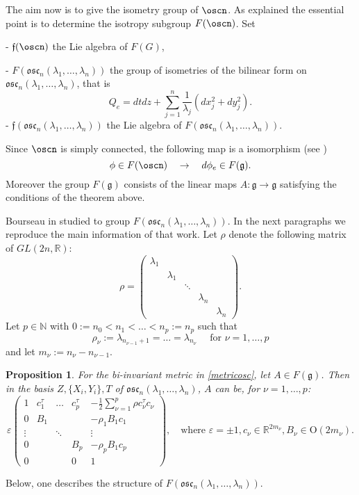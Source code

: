 \documentclass[11pt]{amsart}
\theoremstyle{plain}
\newtheorem{prop}[thm]{Proposition}
\theoremstyle{definition}
\theoremstyle{remark}
\begin{document}
The aim now is to give the isometry group of $\oscn$. As explained the essential point is to determine the isotropy subgroup $F(\oscn)$. Set 

- $\mathfrak f(\oscn)$ the Lie algebra of $F(G)$,

- $F(\mathfrak{osc}_n(\lambda_1, \hdots, \lambda_n))$ the group of isometries of the bilinear form on $\mathfrak{osc}_n(\lambda_1, \hdots, \lambda_n)$, that is 
$$Q_e = dtdz + \sum_{j=1}^n \frac{1}{\lambda_j}(dx_j^2 + dy_j^2).$$
- $\mathfrak f(\mathfrak{osc}_n(\lambda_1, \hdots, \lambda_n))$ the Lie algebra of $F(\mathfrak{osc}_n(\lambda_1, \hdots, \lambda_n))$. 

Since $\oscn$ is simply connected, the following map is a isomorphism (see \cite{MU})
$$\phi \in F(\oscn) \quad \to \quad d\phi_e\in F(\mathfrak g).$$
Moreover the group $F(\mathfrak g)$ consists of the linear maps $A:\mathfrak g\to \mathfrak g$ satisfying the conditions of the theorem above. 

Bourseau in\cite{Bou} studied to group $F(\mathfrak{osc}_n(\lambda_1, \hdots, \lambda_n))$. In the next paragraphs we reproduce the main  information of that work. Let $\rho$ denote the following matrix of $GL(2n, \mathbb R)$:
$$ \rho = \left( 
\begin{matrix} 
\lambda_1 & & & & \\
& \lambda_1 &   & &\\
& & \ddots & & \\
& & & \lambda_n & \\
& & & & \lambda_n
\end{matrix}\right).$$
Let $p\in \mathbb N$ with $0:=n_0 < n_1 < \hdots < n_p:=n_p$ such that
$$\rho_{\nu}:=\lambda_{n_{\nu - 1}+ 1}= \hdots = \lambda_{n_{\nu}}\quad \mbox{ for } \nu=1, \hdots, p$$ and let $m_{\nu}:=n_{\nu}- n_{{\nu}-1}$. 
    
    \begin{prop} For the bi-invariant metric in \eqref{metricosc}, let $A\in F(\mathfrak g)$. Then in the basis $Z, \{X_i, Y_i\}, T$ of $\mathfrak{osc}_n(\lambda_1, \hdots, \lambda_n)$, $A$ can be, for $\nu=1, \hdots, p$:
    	$$\varepsilon  \left( 
    	\begin{matrix} 
    	 1 &	c_1^{\tau}	&\hdots  &c_p^{\tau}   &   -\frac12 \sum_{\nu=1}^p  \rho c_{\nu}^{\tau} c_{\nu}\\
    0	 &	B_1 & & &  - \rho_1 B_1 c_1\\
    \vdots	&	& \ddots &   &  \vdots\\
    0	&	& & B_p &  - \rho_p B_1 c_p\\
   0 & & & 0 & 1
    	\end{matrix}\right), \quad \mbox{where } \varepsilon=\pm 1, c_{\nu}\in \mathbb R^{2m_{\nu}}, B_{\nu}\in \mathrm{O}(2 m_{\nu}).$$
    \end{prop}
Below, one describes the structure of $F(\mathfrak{osc}_n(\lambda_1, \hdots, \lambda_n))$.
\end{document}
